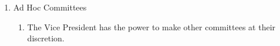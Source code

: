 \begin{enumerate}
\begin{enumerate}
		\end{enumerate}

	\item Ad Hoc Committees
		\begin{enumerate}
			\item The Vice President has the power to make other committees at their discretion. \label{adhoccom}
		\end{enumerate}
\end{enumerate}


